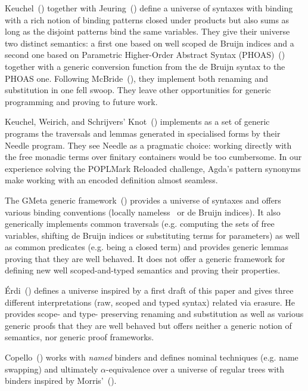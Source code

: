 Keuchel~(\citeyear{Keuchel:Thesis:2011}) together with
Jeuring~(\citeyear{DBLP:conf/icfp/KeuchelJ12})
define a universe of syntaxes with binding with a rich notion of binding
patterns closed under products but also sums as long as the disjoint
patterns bind the same variables.
%
They give their universe two distinct semantics: a first one based on well
scoped de Bruijn indices and a second one based on Parametric Higher-Order
Abstract Syntax (PHOAS)~(\cite{DBLP:conf/icfp/Chlipala08}) together with
a generic conversion function from the de Bruijn syntax to the PHOAS one.
%
Following McBride~(\citeyear{mcbride2005type}), they implement both renaming
and substitution in one fell swoop. They leave other
opportunities for generic programming and proving to future work.

Keuchel, Weirich, and Schrijvers' Knot~(\citeyear{needleandknot}) implements
as a set of generic programs the traversals and lemmas generated in specialised
forms by their Needle program. They see Needle as a pragmatic choice: working
directly with the free monadic terms over finitary containers would be too
cumbersome. In
our experience solving the POPLMark Reloaded challenge, Agda's pattern
synonyms make working with an encoded definition almost
seamless.

The GMeta generic framework~(\citeyear{gmeta}) provides a universe of syntaxes
and offers various binding conventions (locally nameless~\cite{Chargueraud2012}
or de Bruijn indices).
%
It also generically implements common traversals (e.g. computing
the sets of free variables,
shifting
de Bruijn indices or substituting terms for parameters) as well as common
predicates (e.g. being a closed term) and provides generic lemmas proving that
they are well behaved. It does not offer a generic framework
for defining new well scoped-and-typed semantics and proving their properties.

Érdi~(\citeyear{gergodraft}) defines a universe inspired by a first draft of
this paper and gives three different interpretations (raw, scoped and
typed syntax) related via erasure.
%
He provides scope- and type- preserving renaming and
substitution as well as various generic proofs that they are well behaved but
offers neither a generic notion of semantics, nor generic proof frameworks.

Copello~(\citeyear{copello2017}) works with \emph{named} binders and
defines nominal techniques (e.g. name swapping) and ultimately
$\alpha$-equivalence over a universe of regular trees with binders
inspired by Morris'~(\citeyear{morris-regulartt}).


